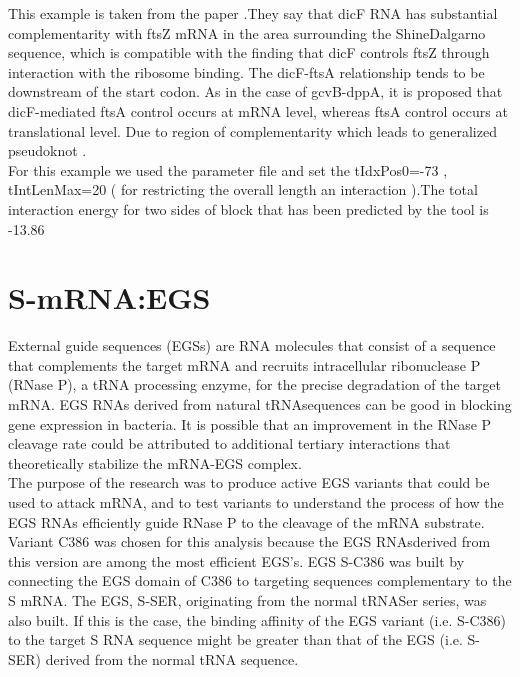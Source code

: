 \documentclass[twoside,a4paper]{report}
\begin{document}
	 This example is taken from the paper \citep{pervouchine2004iris} .They say that dicF RNA has substantial complementarity with ftsZ mRNA in the area surrounding the ShineDalgarno sequence, which is compatible with the finding that dicF controls ftsZ through interaction with the ribosome binding. The dicF-ftsA relationship tends to be downstream of the start codon. As in the case of gcvB-dppA, it is proposed that dicF-mediated ftsA control occurs at mRNA level, whereas ftsA control occurs at translational level. Due to region of complementarity which leads to generalized pseudoknot  . \\
	 
	 For this example we used the parameter file and set the tIdxPos0=-73 , tIntLenMax=20 ( for restricting the overall length an interaction ).The total interaction energy for two sides of block that has been predicted by the tool is -13.86 \\
	 
	 \section{S-mRNA:EGS  }
	 
	 External guide sequences (EGSs) are RNA molecules that consist of a sequence that complements the target mRNA and recruits intracellular ribonuclease P (RNase P), a tRNA processing enzyme, for the precise degradation of the target mRNA. EGS  RNAs  derived  from  natural  tRNAsequences can be good in blocking gene expression in  bacteria. It is possible that an improvement in the RNase P cleavage rate could be attributed to additional tertiary interactions that theoretically stabilize the mRNA-EGS complex.\\
	 
	  The purpose of the research was to produce active EGS variants that could be used to attack mRNA, and to test variants to understand the process of how the EGS RNAs efficiently guide RNase P to the cleavage of the mRNA substrate. Variant C386 was chosen for this analysis because the EGS RNAsderived from this version are among the most efficient EGS's. EGS S-C386 was built by connecting the EGS domain of C386 to targeting sequences complementary to the S mRNA. The EGS, S-SER, originating from the normal tRNASer series, was also built. If this is the case, the binding affinity of the EGS variant (i.e. S-C386) to the target S RNA sequence might be greater than that of the EGS (i.e. S-SER) derived from the normal tRNA sequence. \\
	  
\end{document}

